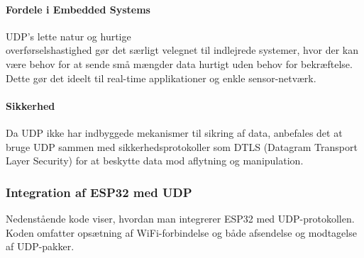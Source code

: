 \documentclass[12pt,a4paper]{book}
\begin{document}
	\paragraph{Fordele i Embedded Systems}
	UDP's lette natur og hurtige\\ overførselshastighed gør det særligt velegnet til indlejrede systemer, hvor der kan være behov for at sende små mængder data hurtigt uden behov for bekræftelse. Dette gør det ideelt til real-time applikationer og enkle sensor-netværk.
	
	\paragraph{Sikkerhed}
	Da UDP ikke har indbyggede mekanismer til sikring af data, anbefales det at bruge UDP sammen med sikkerhedsprotokoller som DTLS (Datagram Transport Layer Security) for at beskytte data mod aflytning og manipulation.
	
	\subsubsection{Integration af ESP32 med UDP}
	
	Nedenstående kode viser, hvordan man integrerer ESP32 med UDP-protokollen. Koden omfatter opsætning af WiFi-forbindelse og både afsendelse og modtagelse af UDP-pakker.
	
\end{document}
